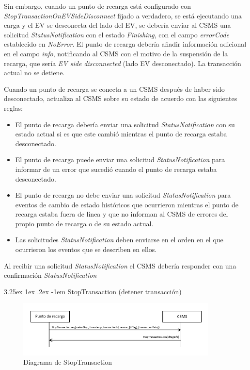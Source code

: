 \documentclass[12pt,a4paper,onecolumn,oneside]{report}
\makeatletter
\renewcommand\paragraph{\@startsection{paragraph}{5}{\z@}%
  {3.25ex \@plus1ex \@minus.2ex}%
  {-1em}%
  {\normalfont\normalsize\bfseries}}
\makeatother
\begin{document}
Sin embargo, cuando un punto de recarga está configurado con \textit{StopTransactionOnEVSideDisconnect} fijado a verdadero, se
está ejecutando una carga y el EV se desconecta del lado del EV, se debería enviar al CSMS una solicitud \textit{StatusNotification} con el estado \textit{Finishing}, con el campo \textit{errorCode} establecido en \textit{NoError}. El punto de recarga debería añadir información adicional en el campo \textit{info}, notificando al CSMS con el motivo de la suspensión de la recarga, que sería \textit{EV side disconnected} (lado EV desconectado). La transacción actual no se detiene.

Cuando un punto de recarga se conecta a un CSMS después de haber sido desconectado, actualiza al CSMS sobre su estado de acuerdo con las siguientes reglas:

\begin{itemize}
\item El punto de recarga debería enviar una solicitud \textit{StatusNotification} con su estado actual si es que este cambió mientras el punto de recarga estaba desconectado.
\item El punto de recarga puede enviar una solicitud \textit{StatusNotification} para informar de un error que sucedió cuando el punto de recarga estaba desconectado.
\item El punto de recarga no debe enviar una solicitud \textit{StatusNotification} para eventos de cambio de estado históricos que
ocurrieron mientras el punto de recarga estaba fuera de línea y que no informan al CSMS de errores del propio punto de recarga o de su estado actual.
\item Las solicitudes \textit{StatusNotification} deben enviarse en el orden en el que ocurrieron los eventos que se describen en ellos.

\end{itemize}

Al recibir una solicitud \textit{StatusNotification} el CSMS debería responder con una confirmación \textit{StatusNotification}

\paragraph{StopTransaction (detener transacción)}
\label{StopTransaction (detener transacción)}


\begin{figure}[H] 
\centering
  \includegraphics[width=0.9\textwidth]{figuras/diagramastoptransaction.png}
  \caption[Diagrama de \textit{StopTransaction}]{Diagrama de StopTransaction\\
  }
  \label{fig:diagramastoptransaction}
\end{figure}
\end{document}

